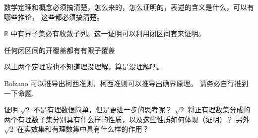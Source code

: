 \begin{exposition}
    数学定理和概念必须搞清楚，怎么来的，怎么证明的，表述的含义是什么，可以有哪些推论，
    这些都必须搞清楚。
\end{exposition}

\begin{exposition}[Bolzano 定理]
    $\mathbb{R}$ 中有界子集必有收敛子列。这一证明可以利用闭区间套来证明。
\end{exposition}

\begin{exposition}
    任何闭区间的开覆盖都有有限子覆盖
\end{exposition}

\begin{exposition}
    以上两个定理我也不知道理没理解，算是没理解吧。
\end{exposition}

\begin{exposition}
    Bolzano 可以推导出柯西准则，柯西准则可以推导出确界原理。
    请务必自行推到一下命题.
\end{exposition}

\begin{note}
    证明 $\sqrt{2}$ 不是有理数很简单，但是更进一步的思考呢？
    $\sqrt{2}$ 将正有理数集分成的两个有理数子集分别具有什么样的性质，以及这些性质如何体现（证明）？
    另外 $\sqrt{2}$ 在实数集和有理数集中具有什么样的作用？
\end{note}